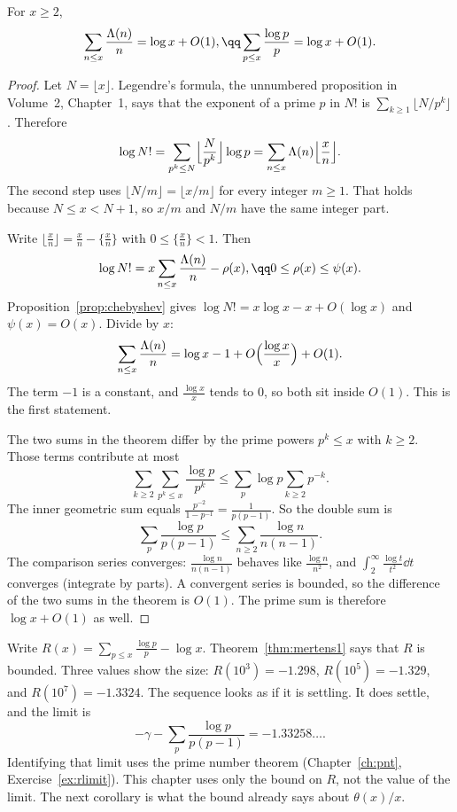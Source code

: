 \begin{theorem}[Mertens, 1874]\label{thm:mertens1}
For $x\ge 2$,
\[
\begin{gathered}\sum_{n\le x}\frac{\Lambda(n)}n=\log x+O(1),\qq\sum_{p\le x}\frac{\log p}p=\log x+O(1).\end{gathered}
\]
\end{theorem}
\begin{proof}
Let $N=\lfloor x\rfloor$. Legendre's formula, the unnumbered proposition in Volume~2, Chapter~1, says that the exponent of a prime $p$ in $N!$ is $\sum_{k\ge 1}\bigl\lfloor N/p^k\bigr\rfloor$. Therefore
\[
\log N!=\sum_{p^k\le N}\Bigl\lfloor\frac N{p^k}\Bigr\rfloor\log p=\sum_{n\le x}\Lambda(n)\Bigl\lfloor\frac xn\Bigr\rfloor.
\]
The second step uses $\bigl\lfloor N/m\bigr\rfloor=\bigl\lfloor x/m\bigr\rfloor$ for every integer $m\ge 1$. That holds because $N\le x<N+1$, so $x/m$ and $N/m$ have the same integer part.

Write $\bigl\lfloor\frac xn\bigr\rfloor=\frac xn-\bigl\{\frac xn\bigr\}$ with $0\le\bigl\{\frac xn\bigr\}<1$. Then
\[
\begin{gathered}\log N!=x\sum_{n\le x}\frac{\Lambda(n)}n-\rho(x),\qq 0\le\rho(x)\le\psi(x).\end{gathered}
\]
Proposition~\ref{prop:chebyshev} gives $\log N!=x\log x-x+O(\log x)$ and $\psi(x)=O(x)$. Divide by $x$:
\[
\sum_{n\le x}\frac{\Lambda(n)}n=\log x-1+O\Bigl(\frac{\log x}x\Bigr)+O(1).
\]
The term $-1$ is a constant, and $\frac{\log x}x$ tends to $0$, so both sit inside $O(1)$. This is the first statement.

The two sums in the theorem differ by the prime powers $p^k\le x$ with $k\ge 2$. Those terms contribute at most
\[
\sum_{k\ge 2}\sum_{p^k\le x}\frac{\log p}{p^k}\le\sum_p\log p\sum_{k\ge 2}p^{-k}.
\]
The inner geometric sum equals $\frac{p^{-2}}{1-p^{-1}}=\frac1{p(p-1)}$. So the double sum is
\[
\sum_p\frac{\log p}{p(p-1)}\le\sum_{n\ge 2}\frac{\log n}{n(n-1)}.
\]
The comparison series converges: $\frac{\log n}{n(n-1)}$ behaves like $\frac{\log n}{n^2}$, and $\int_2^\infty\frac{\log t}{t^2}\dd t$ converges (integrate by parts). A convergent series is bounded, so the difference of the two sums in the theorem is $O(1)$. The prime sum is therefore $\log x+O(1)$ as well.
\end{proof}

Write $R(x)=\sum_{p\le x}\frac{\log p}p-\log x$. Theorem~\ref{thm:mertens1} says that $R$ is bounded. Three values show the size: $R(10^3)=-1.298$, $R(10^5)=-1.329$, and $R(10^7)=-1.3324$. The sequence looks as if it is settling. It does settle, and the limit is
\[
-\gamma-\sum_p\frac{\log p}{p(p-1)}=-1.33258\ldots.
\]
Identifying that limit uses the prime number theorem (Chapter~\ref{ch:pnt}, Exercise~\ref{ex:rlimit}). This chapter uses only the bound on $R$, not the value of the limit. The next corollary is what the bound already says about $\theta(x)/x$.

